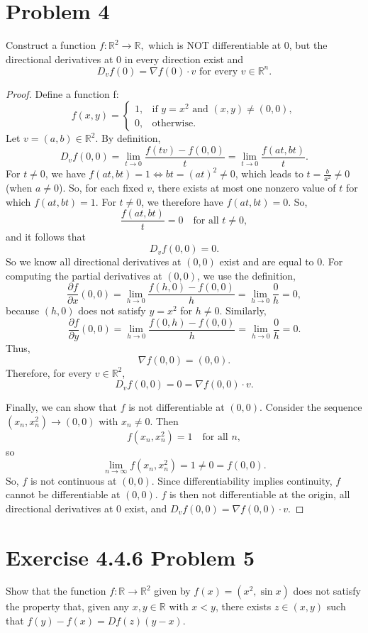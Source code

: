 \documentclass{article}
\begin{document}
\section*{Problem 4}
Construct a function $f: \mathbb{R}^2 \rightarrow \mathbb{R},$ which is NOT differentiable at 0, but the directional derivatives at 0 in every direction exist and 
$$ D_vf(0) =  \nabla f(0) \cdot v  \text{ for every } v \in \mathbb{R}^n.$$
\begin{proof}
Define a function f:
\[
f(x,y)=
\begin{cases}
1, & \text{if } y=x^2 \text{ and } (x,y)\neq(0,0),\\
0, & \text{otherwise}.
\end{cases}
\]
Let $v=(a,b)\in\mathbb{R}^2$. By definition,
\[
D_vf(0,0)=\lim_{t\to0}\frac{f(tv)-f(0,0)}{t}
=\lim_{t\to0}\frac{f(at,bt)}{t}.
\]
For $t\neq0$, we have $f(at,bt)=1 \iff bt=(at)^2\neq0$, which leads to $t=\frac{b}{a^2}\neq0$ (when $a\neq0$). So, for each fixed $v$, there exists at most one nonzero value of $t$ for which $f(at,bt)=1$. For $t\neq0$, we therefore have $f(at,bt)=0$. So,
\[
\frac{f(at,bt)}{t}=0
\quad\text{for all } t\neq0,
\]
and it follows that
\[
D_vf(0,0)=0.
\]
So we know all directional derivatives at $(0,0)$ exist and are equal to $0$. For computing the partial derivatives at $(0,0)$, we use the definition,
\[
\frac{\partial f}{\partial x}(0,0)
=\lim_{h\to0}\frac{f(h,0)-f(0,0)}{h}
=\lim_{h\to0}\frac{0}{h}=0,
\]
because $(h,0)$ does not satisfy $y=x^2$ for $h\neq0$. Similarly,
\[
\frac{\partial f}{\partial y}(0,0)
=\lim_{h\to0}\frac{f(0,h)-f(0,0)}{h}
=\lim_{h\to0}\frac{0}{h}=0.
\]
Thus,
\[
\nabla f(0,0)=(0,0).
\]
Therefore, for every $v\in\mathbb{R}^2$,
\[
D_vf(0,0)=0=\nabla f(0,0)\cdot v.
\]

Finally, we can show that $f$ is not differentiable at $(0,0)$. Consider the sequence $(x_n,x_n^2)\to(0,0)$ with $x_n\neq0$. Then
\[
f(x_n,x_n^2)=1
\quad\text{for all } n,
\]
so
\[
\lim_{n\to\infty}f(x_n,x_n^2)=1\neq0=f(0,0).
\]
So, $f$ is not continuous at $(0,0)$. Since differentiability implies continuity, $f$ cannot be differentiable at $(0,0)$. $f$ is then not differentiable at the origin, all directional derivatives at $0$ exist, and $D_vf(0,0)=\nabla f(0,0)\cdot v.$
\end{proof}


\clearpage 

\section*{Exercise 4.4.6 Problem 5}
Show that the function $f : \mathbb{R} \rightarrow \mathbb{R}^2$ given by $f(x) = (x^2, \sin x)$ does not satisfy the property that, given any $x, y \in \mathbb{R}$ with $x < y$, there exists $z \in (x, y)$ such that $f (y) - f (x) = Df (z)(y - x)$.
\end{document}
